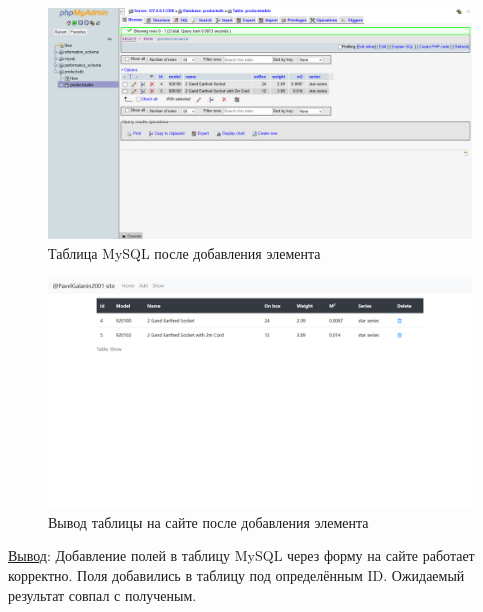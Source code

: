 \begin{figure}[!htp]
    \begin{center}
        \includegraphics[width=12cm]{../_input/tests/mysql_table_after.png}
    \end{center}
    \caption{Таблица MySQL после добавления элемента\label{fig:mysql_table_after}}
\end{figure}

\begin{figure}[!htp]
    \begin{center}
        \includegraphics[width=12cm]{../_input/tests/site_table_after.png}
    \end{center}
    \caption{Вывод таблицы на сайте после добавления элемента\label{fig:site_table_after}}
\end{figure}

\underline{Вывод}:
Добавление полей в таблицу MySQL через форму на сайте работает корректно. Поля добавились в таблицу под определённым ID. Ожидаемый результат совпал с полученым.
